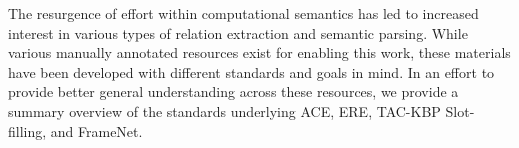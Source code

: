The resurgence of effort within computational semantics has led to increased interest in various types of relation extraction and semantic parsing. While various manually annotated resources exist for enabling this work, these materials have been developed with different standards and goals in mind. In an effort to provide better general understanding across these resources, we provide a summary overview of the standards underlying ACE, ERE, TAC-KBP Slot-filling, and FrameNet.
